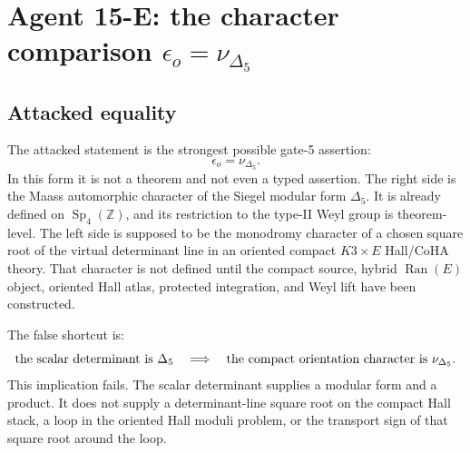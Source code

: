 \providecommand{\Z}{\mathbb Z}
\providecommand{\C}{\mathbb C}
\providecommand{\La}{\Lambda}
\providecommand{\Sp}{\operatorname{Sp}}
\providecommand{\Orth}{\operatorname{O}}
\providecommand{\Aut}{\operatorname{Aut}}
\providecommand{\Ran}{\operatorname{Ran}}
\providecommand{\CoHA}{\operatorname{CoHA}}
\providecommand{\Hall}{\mathcal H}
\providecommand{\Prim}{\operatorname{Prim}}
\providecommand{\sdim}{\operatorname{sdim}}
\providecommand{\sdet}{\operatorname{sdet}}
\providecommand{\RHom}{\operatorname{RHom}}
\providecommand{\nuDelta}{\nu_{\Delta_5}}
\providecommand{\epsor}{\epsilon_o}
\providecommand{\gDelta}{\mathfrak g_{\Delta_5}}
\providecommand{\WII}{W^{(2)}(\La^{2,1}_{II})}
\providecommand{\KX}{\mathfrak K_X}
\providecommand{\FX}{\mathcal F_X}
\providecommand{\HX}{\mathcal H_X}

\section{Agent 15-E: the character comparison
\texorpdfstring{\(\epsilon_o=\nu_{\Delta_5}\)}{epsilon equals nu Delta5}}
\label{sec:agent15-epsilon-nu-delta5}

\subsection{Attacked equality}

The attacked statement is the strongest possible gate-5 assertion:
\[
        \epsor=\nuDelta .
\]
In this form it is not a theorem and not even a typed assertion.  The
right side is the Maass automorphic character of the Siegel modular form
\(\Delta_5\).  It is already defined on \(\Sp_4(\Z)\), and its
restriction to the type-II Weyl group is theorem-level.  The left side
is supposed to be the monodromy character of a chosen square root of the
virtual determinant line in an oriented compact \(K3\times E\)
Hall/CoHA theory.  That character is not defined until the compact
source, hybrid \(\Ran(E)\) object, oriented Hall atlas, protected
integration, and Weyl lift have been constructed.

The false shortcut is:
\[
\hbox{the scalar determinant is } \Delta_5
\quad\Longrightarrow\quad
\hbox{the compact orientation character is } \nuDelta .
\]
This implication fails.  The scalar determinant supplies a modular form
and a product.  It does not supply a determinant-line square root on the
compact Hall stack, a loop in the oriented Hall moduli problem, or the
transport sign of that square root around the loop.

